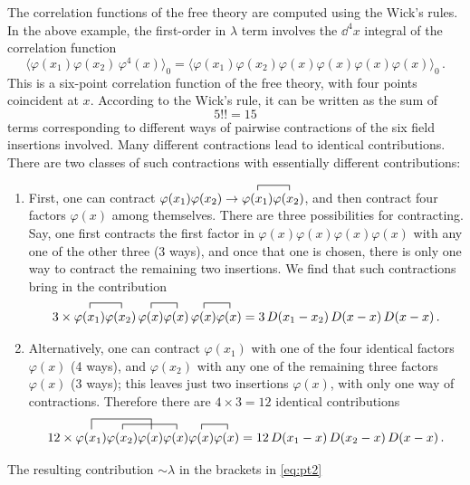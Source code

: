 The correlation functions of the free theory are computed using the Wick's
rules. In the above example, the first-order in $\lambda$ term involves the
$\dd^4x$ integral of the correlation function
\[
\bigl\langle\varphi(x_1)\varphi(x_2)\,\varphi^4(x)\bigr\rangle_0=\bigl\langle\varphi(x_1)\varphi(x_2)\varphi(x)\varphi(x)\varphi(x)\varphi(x)\bigr\rangle_0\,.
\]
This is a six-point correlation function of the free theory, with four points
coincident at $x$. According to the Wick's rule, it can be written as the sum
of
\[
5!!=15
\]
terms corresponding to different ways of pairwise contractions of the six field
insertions involved. Many different contractions lead to identical
contributions. There are two classes of such contractions with essentially
different contributions:
\begin{enumerate}[label=(\roman*)]
\item First, one can contract $\varphi(x_1)\varphi(x_2)\to
\contraction{}{\varphi(x_1)}{}{\varphi(x_2)}\varphi(x_1)\varphi(x_2)$, and then
contract four factors $\varphi(x)$ among themselves. There are three
possibilities for contracting. Say, one first contracts the first factor in
$\varphi(x)\varphi(x)\varphi(x)\varphi(x)$ with any one of the other three (3
ways), and once that one is chosen, there is only one way to contract the
remaining two insertions. We find that such contractions bring in the
contribution
\[
3\times
\contraction{}{\varphi(x_1)}{}{\varphi(x_2)}
\contraction{\varphi(x_1)\varphi(x_2)\,}{\varphi(x)}{}{\varphi(x)}
\contraction{\varphi(x_1)\varphi(x_2)\,\varphi(x)\varphi(x)\,}{\varphi(x)}{}{\varphi(x)}
\varphi(x_1)\varphi(x_2)\,\varphi(x)\varphi(x)\,\varphi(x)\varphi(x)
=3\,D(x_1-x_2)\,D(x-x)\,D(x-x)\,.
\]

\item Alternatively, one can contract $\varphi(x_1)$ with one of the four
identical factors $\varphi(x)$ (4 ways), and $\varphi(x_2)$ with any one of the
remaining three factors $\varphi(x)$ (3 ways); this leaves just two insertions
$\varphi(x)$, with only one way of contractions. Therefore there are
$4\times3=12$ identical contributions
\[
12\times
\contraction[2ex]{}{\varphi(x_1)}{\varphi(x_2)}{\varphi(x)}
\contraction{\varphi(x_1)}{\varphi(x_2)}{\varphi(x)}{\varphi(x)}
\contraction{\varphi(x_1)\varphi(x_2)\varphi(x)\varphi(x)}{\varphi(x)}{}{\varphi(x)}
\varphi(x_1)\varphi(x_2)\varphi(x)\varphi(x)\varphi(x)\varphi(x)
=12\,D(x_1-x)\,D(x_2-x)\,D(x-x)\,.
\]
\end{enumerate}
The resulting contribution $\sim\lambda$ in the brackets in \eqref{eq:pt2}
